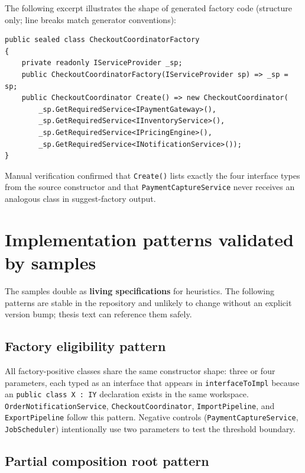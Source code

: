 The following excerpt illustrates the shape of generated factory code (structure only; line breaks match generator conventions):

\begin{lstlisting}[caption={Generated factory pattern (conceptual)}]
public sealed class CheckoutCoordinatorFactory
{
    private readonly IServiceProvider _sp;
    public CheckoutCoordinatorFactory(IServiceProvider sp) => _sp = sp;
    public CheckoutCoordinator Create() => new CheckoutCoordinator(
        _sp.GetRequiredService<IPaymentGateway>(),
        _sp.GetRequiredService<IInventoryService>(),
        _sp.GetRequiredService<IPricingEngine>(),
        _sp.GetRequiredService<INotificationService>());
}
\end{lstlisting}

Manual verification confirmed that \texttt{Create()} lists exactly the four interface types from the source constructor and that \texttt{PaymentCaptureService} never receives an analogous class in suggest-factory output.

\section{Implementation patterns validated by samples}
\label{chap5:patterns}

The samples double as \textbf{living specifications} for heuristics. The following patterns are stable in the repository and unlikely to change without an explicit version bump; thesis text can reference them safely.

\subsection{Factory eligibility pattern}

All factory-positive classes share the same constructor shape: three or four parameters, each typed as an interface that appears in \texttt{interfaceToImpl} because an \texttt{public class X : IY} declaration exists in the same workspace. \texttt{OrderNotificationService}, \texttt{CheckoutCoordinator}, \texttt{ImportPipeline}, and \texttt{ExportPipeline} follow this pattern. Negative controls (\texttt{PaymentCaptureService}, \texttt{JobScheduler}) intentionally use two parameters to test the threshold boundary.

\subsection{Partial composition root pattern}

